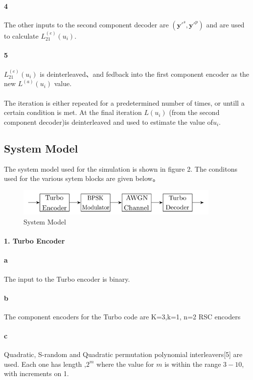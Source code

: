 \documentclass[20 pts]{article}
\begin{document}
\paragraph{4}
The other inputs to the second component decoder are $({\boldsymbol{y}'}^s,{\boldsymbol{y}'}^p)$ and are used to calculate $L_{21}^{(e)}(u_i)$.
\paragraph{5}
$L_{21}^{(e)}(u_i)$ is deinterleaved、and fedback into the first component encoder as the new $L^{(a)}(u_i)$ value.
\paragraph{}
The iteration is either repeated for a predetermined number of times, or untill a certain condition is met. At the final iteration $L(u_i)$ (from the second component decoder)is deinterleaved and used to estimate the value of$u_i$.


\subsection{System Model}
The system model used for the simulation is shown in figure 2. The conditons used for the various sytem blocks are given below。
\begin{figure}[h]
\includegraphics[width=10cm]{figure4.pdf}
\caption{System Model}
\label{}
\end{figure}%
\paragraph{1. \textbf{Turbo Encoder}}
\paragraph{a}
The input to the Turbo encoder is binary.
\paragraph{b}
The component encoders for the Turbo code are  K=3,k=1, n=2 RSC encoders
\paragraph{c}
Quadratic, S-random and Quadratic permutation polynomial interleavers[5] are used. Each one has length ,$2^m$ where the value for  $m$ is within the range ${3 - 10}$, with increments on 1.
\end{document}
